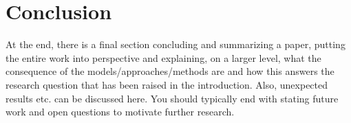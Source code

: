 \documentclass[conference]{IEEEtran}  %
\theoremstyle{plain}
\theoremstyle{definition}
\theoremstyle{remark}
\begin{document}
\section{Conclusion}
\label{sec:concl}

At the end, there is a final section concluding and summarizing a paper, putting the entire work into perspective and explaining, on a larger level, what the consequence of the models/approaches/methods are and how this answers the research question that has been raised in the introduction. Also, unexpected results etc. can be discussed here. You should typically end with stating future work and open questions to motivate further research.



\end{document}
